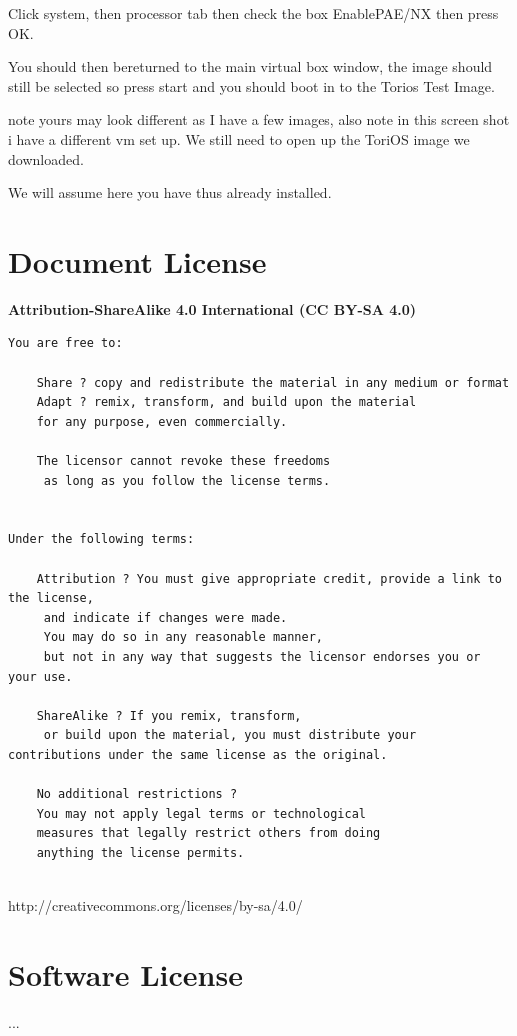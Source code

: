 \documentclass[12pt,a4paper]{book}
\begin{document}
Click system, then processor tab then check the box EnablePAE/NX then press OK.

You should then bereturned to the main virtual box window,  the image should still be selected so press start and you should boot in to the Torios Test Image. 

 note yours may look different as I have a few images,  also note in this screen shot i have a different vm set up.  We still need to open up the ToriOS image we downloaded. 

We will assume here you have thus already installed.


\chapter{Document License}
\textbf{Attribution-ShareAlike 4.0 International (CC BY-SA 4.0)}

\begin{verbatim}
You are free to:

    Share ? copy and redistribute the material in any medium or format
    Adapt ? remix, transform, and build upon the material
    for any purpose, even commercially.

    The licensor cannot revoke these freedoms
     as long as you follow the license terms.


Under the following terms:

    Attribution ? You must give appropriate credit, provide a link to the license,
     and indicate if changes were made. 
     You may do so in any reasonable manner, 
     but not in any way that suggests the licensor endorses you or your use.

    ShareAlike ? If you remix, transform,
     or build upon the material, you must distribute your contributions under the same license as the original.

    No additional restrictions ? 
    You may not apply legal terms or technological 
    measures that legally restrict others from doing 
    anything the license permits.


\end{verbatim}

http://creativecommons.org/licenses/by-sa/4.0/

\chapter{Software License}
...
\end{document}
